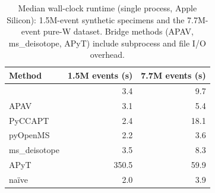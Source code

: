 \begin{table}[t]
\centering
\caption{Median wall-clock runtime (single process, Apple Silicon):
1.5M-event synthetic specimens and the 7.7M-event pure-W dataset.
Bridge methods (APAV, ms\_deisotope, APyT) include subprocess and
file I/O overhead.}
\label{tab:runtime}
\small
\begin{tabular}{lrr}
\toprule
Method & 1.5M events (s) & 7.7M events (s) \\
\midrule
\rf{} & 3.4 & 9.7 \\
APAV & 3.1 & 5.4 \\
PyCCAPT & 2.4 & 18.1 \\
pyOpenMS & 2.2 & 3.6 \\
ms\_deisotope & 3.5 & 8.3 \\
APyT & 350.5 & 59.9 \\
na\"ive & 2.0 & 3.9 \\
\bottomrule
\end{tabular}
\end{table}
